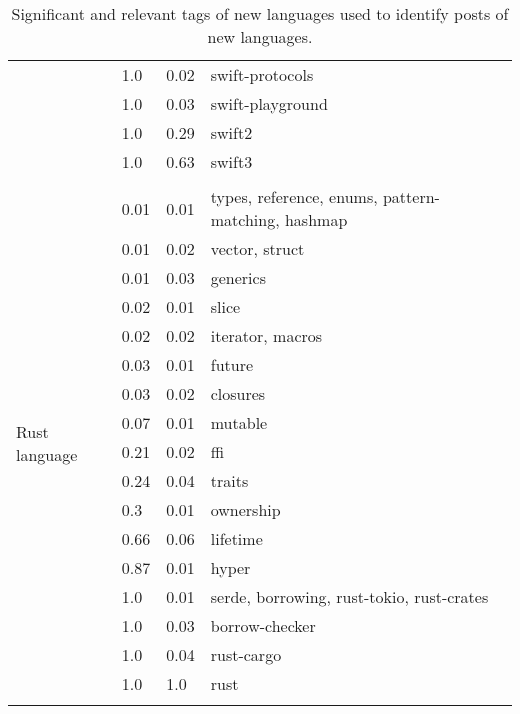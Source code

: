 \begin{longtable}{|l|l|l|l|}
               & 1.0  &  0.02  &  swift-protocols   \\ \cline{2-4}
               & 1.0  &  0.03  &  swift-playground   \\ \cline{2-4}
               & 1.0  &  0.29  &  swift2   \\ \cline{2-4}
               & 1.0  &  0.63  &  swift3   \\ \hline
\multicolumn{4}{|l|}{}                                    \\ \hline               
\multirow{25}{*}{Rust language} & 0.01  &  0.01  &  types, reference, enums, pattern-matching, hashmap   \\ \cline{2-4}
               & 0.01  &  0.02  &  vector, struct   \\ \cline{2-4}
               & 0.01  &  0.03  &  generics   \\ \cline{2-4}
               & 0.02  &  0.01  &  slice   \\ \cline{2-4}
               & 0.02  &  0.02  &  iterator, macros   \\ \cline{2-4}
               & 0.03  &  0.01  &  future   \\ \cline{2-4}
               & 0.03  &  0.02  &  closures   \\ \cline{2-4}
               & 0.07  &  0.01  &  mutable   \\ \cline{2-4}
               & 0.21  &  0.02  &  ffi   \\ \cline{2-4}
               & 0.24  &  0.04  &  traits   \\ \cline{2-4}
               & 0.3  &  0.01  &  ownership   \\ \cline{2-4}
               & 0.66  &  0.06  &  lifetime   \\ \cline{2-4}
               & 0.87  &  0.01  &  hyper   \\ \cline{2-4}
               & 1.0  &  0.01  &  serde, borrowing, rust-tokio, rust-crates   \\ \cline{2-4}
               & 1.0  &  0.03  &  borrow-checker   \\ \cline{2-4}
               & 1.0  &  0.04  &  rust-cargo   \\ \cline{2-4}
               & 1.0  &  1.0  &  rust   \\ \hline
               
               
\caption{Significant and relevant tags of new languages used  to identify posts of new languages.}
\end{longtable}
